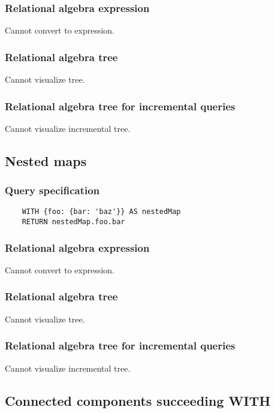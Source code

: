 	\subsubsection*{Relational algebra expression}

	Cannot convert to expression.

	\subsubsection*{Relational algebra tree}

	Cannot visualize tree.

	\subsubsection*{Relational algebra tree for incremental queries}

	Cannot visualize incremental tree.
	\subsection{Nested maps}

	\subsubsection*{Query specification}

	\begin{lstlisting}
	WITH {foo: {bar: 'baz'}} AS nestedMap
	RETURN nestedMap.foo.bar
	\end{lstlisting}


	\subsubsection*{Relational algebra expression}

	Cannot convert to expression.

	\subsubsection*{Relational algebra tree}

	Cannot visualize tree.

	\subsubsection*{Relational algebra tree for incremental queries}

	Cannot visualize incremental tree.
	\subsection{Connected components succeeding WITH}

